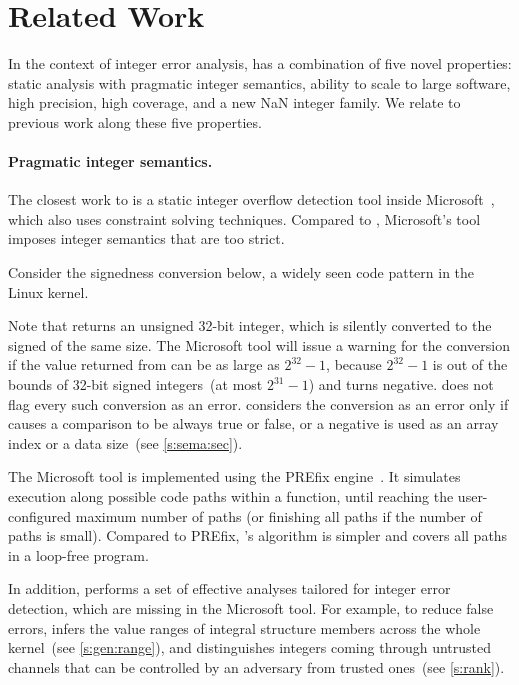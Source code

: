 \section{Related Work}
\label{s:relwk}

In the context of integer error analysis, \sys has a combination of five novel
properties: static analysis with pragmatic integer semantics, ability to scale
to large software, high precision, high coverage, and a new NaN integer family.
We relate \sys to previous work along these five properties.

\paragraph{Pragmatic integer semantics.} The closest work to \sys is a static integer overflow detection
tool inside Microsoft~\cite{moy:z3prefix}, which also uses constraint solving
techniques.  Compared to \sys, Microsoft's tool imposes integer
semantics that are too strict.

Consider the signedness conversion below, a widely seen code pattern in
the Linux kernel.

Note that  returns an unsigned 32-bit integer, which
is silently converted to the signed  of the same size.
The Microsoft tool will issue a warning for the conversion if
the value returned from  can be as large as $2^{32}
- 1$, because $2^{32} - 1$ is out of the bounds of 32-bit signed
integers~(at most $2^{31} - 1$) and turns  negative.
%
\sys does not flag every such conversion as an error.  \sys considers
the conversion as an error only if  causes a comparison
to be always true or false, or a negative  is used as
an array index or a data size~(see \autoref{s:sema:sec}).

The Microsoft tool is implemented using the PREfix
engine~\cite{bush:prefix}.  It simulates execution along possible
code paths within a function, until reaching
the user-configured maximum number of paths (or finishing all paths
if the number of paths is small).
%
Compared to PREfix, \sys's algorithm is simpler
and covers all paths in a loop-free program.
\fi

In addition, \sys performs a set of effective analyses
tailored for integer error detection, which are missing in the
Microsoft tool.  For example, to reduce false errors, \sys infers
the value ranges of integral structure members across the whole
kernel~(see \autoref{s:gen:range}), and distinguishes integers coming
through untrusted channels that can be controlled by an adversary
from trusted ones~(see \autoref{s:rank}).

